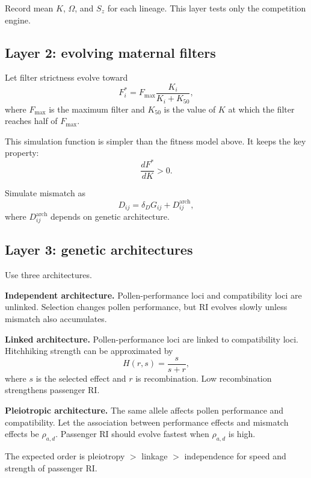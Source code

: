 \documentclass[12pt]{article}
\begin{document}
Record mean $K$, $\Omega$, and $S_z$ for each lineage. This layer tests only the competition engine.

\subsection{Layer 2: evolving maternal filters}

Let filter strictness evolve toward
\begin{equation}
F_i^*=F_{\max}\frac{K_i}{K_i+K_{50}},
\label{eq:Fsimulation}
\end{equation}
where $F_{\max}$ is the maximum filter and $K_{50}$ is the value of $K$ at which the filter reaches half of $F_{\max}$.

This simulation function is simpler than the fitness model above. It keeps the key property:
\begin{equation}
\frac{dF^*}{dK}>0.
\end{equation}

Simulate mismatch as
\begin{equation}
D_{ij}=\delta_DG_{ij}+D^{\mathrm{arch}}_{ij},
\end{equation}
where $D^{\mathrm{arch}}_{ij}$ depends on genetic architecture.

\subsection{Layer 3: genetic architectures}

Use three architectures.

\textbf{Independent architecture.} Pollen-performance loci and compatibility loci are unlinked. Selection changes pollen performance, but RI evolves slowly unless mismatch also accumulates.

\textbf{Linked architecture.} Pollen-performance loci are linked to compatibility loci. Hitchhiking strength can be approximated by
\begin{equation}
H(r,s)=\frac{s}{s+r},
\end{equation}
where $s$ is the selected effect and $r$ is recombination. Low recombination strengthens passenger RI.

\textbf{Pleiotropic architecture.} The same allele affects pollen performance and compatibility. Let the association between performance effects and mismatch effects be $\rho_{a,d}$. Passenger RI should evolve fastest when $\rho_{a,d}$ is high.

\begin{conclusionbox}
The expected order is pleiotropy $>$ linkage $>$ independence for speed and strength of passenger RI.
\end{conclusionbox}
\end{document}
